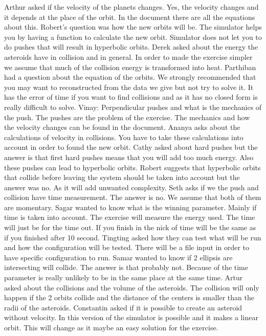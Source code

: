 Arthur asked if the velocity of the planets changes.
Yes, the velocity changes and it depends at the place of the orbit. In the document there are all the equations about this.
Robert’s question was how the new orbits will be.
The simulator helps you by having a function to calculate the new orbit. Simulator does not let you to do pushes that will result in hyperbolic orbits.
Derek asked about the energy the asteroids have in collision and in general.
In order to made the exercise simpler we assume that much of the collision energy is transformed into heat. 
Parthiban had a question about the equation of the orbits. We strongly recommended that you may want to reconstructed from the data we give but not try to solve it. It has the error of time if you want to find collisions and as it has no closed form is really difficult to solve.
Vinay: Perpendicular pushes and what is the mechanics of the push.
The pushes are the problem of the exercise. The mechanics and how the velocity changes can be found in the document.
Ananya asks about the calculations of velocity in collisions. You have to take these calculations into account in order to found the new orbit.
Cathy asked about hard pushes but the answer is that first hard pushes means that you will add too much energy. Also these pushes can lead to hyperbolic orbits.
Robert suggests that hyperbolic orbits that collide before leaving the system should be taken into account but the answer was no. As it will add unwanted complexity.
Seth asks if we the push and collision have time measurement. The answer is no. We assume that both of them are momentary. 
Sagar wanted to know what is the winning parameter. Mainly if time is taken into account. The exercise will measure the energy used. The time will just be for the time out. If you finish in the nick of time will be the same as if you finished after 10 second. 
Tingting asked how they can test what will be run and how the configuration will 
be tested. There will be a file input in order to have specific configuration to run.
Samar wanted to know if 2 ellipsis are intersecting will collide. The answer is that probably not. Because of the time parameter is really unlikely to be in the same place at the same time.
Artur asked about the collisions and the volume of the asteroids. The collision will only happen if the 2 orbits collide and the distance of the centers is smaller than the radii of the asteroids.
Constantin asked if it is possible to create an asteroid without velocity. In this version of the simulator is possible and it makes a linear orbit. This will change as it maybe an easy solution for the exercise.
